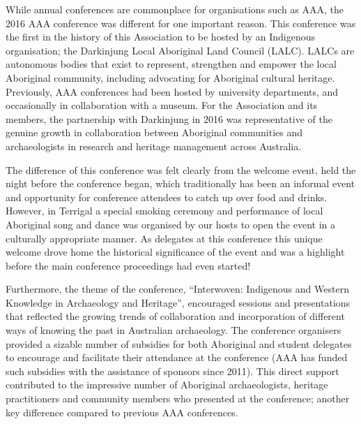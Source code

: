 While annual conferences are commonplace for organisations such as AAA, the 2016 AAA conference was different for one important reason. This conference was the first in the history of this Association to be hosted by an Indigenous organisation; the Darkinjung Local Aboriginal Land Council (LALC). LALCs are autonomous bodies that exist to represent, strengthen and empower the local Aboriginal community, including advocating for Aboriginal cultural heritage. Previously, AAA conferences had been hosted by university departments, and occasionally in collaboration with a museum. For the Association and its members, the partnership with Darkinjung in 2016 was representative of the genuine growth in collaboration between Aboriginal communities and archaeologists in research and heritage management across Australia.

The difference of this conference was felt clearly from the welcome event, held the night before the conference began, which traditionally has been an informal event and opportunity for conference attendees to catch up over food and drinks. However, in Terrigal a special smoking ceremony and performance of local Aboriginal song and dance was organised by our hosts to open the event in a culturally appropriate manner. As delegates at this conference this unique welcome drove home the historical significance of the event and was a highlight before the main conference proceedings had even started!

Furthermore, the theme of the conference, “Interwoven: Indigenous and Western Knowledge in Archaeology and Heritage”, encouraged sessions and presentations that reflected the growing trends of collaboration and incorporation of different ways of knowing the past in Australian archaeology. The conference organisers provided a sizable number of subsidies for both Aboriginal and student delegates to encourage and facilitate their attendance at the conference (AAA has funded such subsidies with the assistance of sponsors since 2011). This direct support contributed to the impressive number of Aboriginal archaeologists, heritage practitioners and community members who presented at the conference; another key difference compared to previous AAA conferences.

